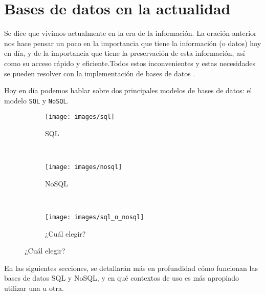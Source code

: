 \section{Bases de datos en la actualidad}

Se dice que vivimos actualmente en la era de la información. La oración anterior nos hace pensar un poco en la importancia que tiene la información (o datos) hoy en día, y de la importancia que tiene la preservación de esta información, así como su acceso rápido y eficiente.Todos estos inconvenientes y estas necesidades se pueden resolver con la implementación de bases de datos \cite{ref6}.

Hoy en día podemos hablar sobre dos principales modelos de bases de datos: el modelo \texttt{SQL} y \texttt{NoSQL}.

\begin{figure}[H]
	\centering
	\begin{subfigure}[b]{0.4\textwidth}
		\texttt{[image: images/sql]}
		\caption{SQL}
		\label{fig:sql}
	\end{subfigure}
	~ 
	\begin{subfigure}[b]{0.4\textwidth}
		\texttt{[image: images/nosql]}
		\caption{NoSQL}
		\label{fig:nosql}
	\end{subfigure}
	~ 
	\begin{subfigure}[b]{0.5\textwidth}
		\texttt{[image: images/sql\_o\_nosql]}
		\caption{¿Cuál elegir?}
		\label{fig:cualelegir}
	\end{subfigure}
\end{figure}

En las siguientes secciones, se detallarán más en profundidad cómo funcionan las bases de datos SQL y NoSQL, y en qué contextos de uso es más apropiado utilizar una u otra.

\newpage